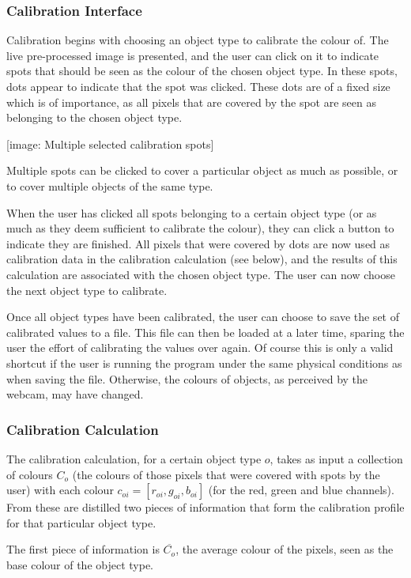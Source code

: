 \documentclass[10pt,twocolumn]{scrartcl}
\begin{document}
\subsubsection{Calibration Interface}
Calibration begins with choosing an object type to calibrate the colour of. The live pre-processed image is presented, and the user can click on it to indicate spots that should be seen as the colour of the chosen object type. In these spots, dots appear to indicate that the spot was clicked. These dots are of a fixed size which is of importance, as all pixels that are covered by the spot are seen as belonging to the chosen object type.

[image: Multiple selected calibration spots]

Multiple spots can be clicked to cover a particular object as much as possible, or to cover multiple objects of the same type.

When the user has clicked all spots belonging to a certain object type (or as much as they deem sufficient to calibrate the colour), they can click a button to indicate they are finished. All pixels that were covered by dots are now used as calibration data in the calibration calculation (see below), and the results of this calculation are associated with the chosen object type. The user can now choose the next object type to calibrate.

Once all object types have been calibrated, the user can choose to save the set of calibrated values to a file. This file can then be loaded at a later time, sparing the user the effort of calibrating the values over again. Of course this is only a valid shortcut if the user is running the program under the same physical conditions as when saving the file. Otherwise, the colours of objects, as perceived by the webcam, may have changed.

\subsubsection{Calibration Calculation}

The calibration calculation, for a certain object type $o$, takes as input a collection of colours $C_o$ (the colours of those pixels that were covered with spots by the user) with each colour $c_{oi} = [r_{oi},g_{oi},b_{oi}]$ (for the red, green and blue channels). From these are distilled two pieces of information that form the calibration profile for that particular object type.

The first piece of information is $\overline{C_o}$, the average colour of the pixels, seen as the base colour of the object type.
 
\end{document}
